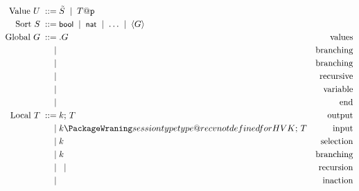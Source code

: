 \documentclass{article}
\begin{document}
\begin{align*}
  \text{Value}\ U
    \grmeq & \VEC{S} \grmor T@\participant{p} \\
  \text{Sort}\ S
  \grmeq & \keyword{bool} \grmor \keyword{nat} \grmor \dots \grmor \langle G\rangle\\
  \text{Global}\ G
    \grmeq & \gsendType p{p'}{k}UG   & \text{values}\\
    \grmor & \gbranchType p{p'}{k}lG & \text{branching}\\
    \grmor & \gparType G{G'}         & \text{branching}\\
    \grmor & \grecurType tG          & \text{recursive}\\
    \grmor & \grecvarType t          & \text{variable}\\
    \grmor & \gendType               & \text{end}\\
  \text{Local}\ T
    \grmeq & \sendType[k] UT   & \text{output}\\
    \grmor & \recvType[k] UT   & \text{input}\\
    \grmor & \selectType[k] lT & \text{selection}\\
    \grmor & \branchType[k] lT & \text{branching}\\
    \grmor & \recurType tT \grmor \recvarType t
                               & \text{recursion}\\
    \grmor & \EndType          & \text{inaction}\\
\end{align*}
\end{document}
